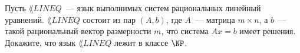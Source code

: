 Пусть $\lang{LINEQ}$~--- язык выполнимых систем рациональных линейный уравнений. $\lang{LINEQ}$ состоит из пар $(A, b)$, где
$A$~--- матрица $m \times n$, а $b$~--- такой рациональный вектор размерности $m$, что система $Ax = b$ имеет
решения. Докажите, что язык $\lang{LINEQ}$ лежит в классе $\NP$.
